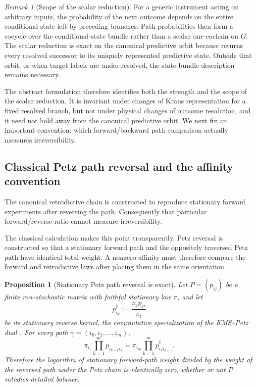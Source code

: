 \documentclass[11pt]{article}
\newtheorem{proposition}[theorem]{Proposition}
\theoremstyle{definition}
\theoremstyle{remark}
\newtheorem{remark}[theorem]{Remark}
\begin{document}
\begin{remark}[Scope of the scalar reduction]
For a generic instrument acting on arbitrary inputs, the probability of the
next outcome depends on the entire conditional state left by preceding
branches.  Path probabilities then form a cocycle over the conditional-state
bundle rather than a scalar one-cochain on $G$.  The scalar reduction is exact
on the canonical predictive orbit because
 returns every resolved successor to its
uniquely represented predictive state.  Outside that orbit, or when target
labels are under-resolved, the state-bundle description remains necessary.
\end{remark}

The abstract formulation therefore identifies both the strength and the scope of
the scalar reduction.  It is invariant under changes of Kraus representation for
a fixed resolved branch, but not under physical changes of outcome resolution,
and it need not hold away from the canonical predictive orbit.  We next fix an
important convention: which forward/backward path comparison actually measures
irreversibility.

\subsection{Classical Petz path reversal and the affinity convention}
\label{subsec:classical-petz-path-reversal}

The canonical retrodictive chain is constructed to reproduce stationary
forward experiments after reversing the path.  Consequently that particular
forward/reverse ratio cannot measure irreversibility.

The classical calculation makes this point transparently.  Petz reversal is
constructed so that a stationary forward path and the oppositely traversed Petz
path have identical total weight.  A nonzero affinity must therefore compare the
forward and retrodictive laws after placing them in the same orientation.

\begin{proposition}[Stationary Petz path reversal is exact]
\label{prop:stationary-petz-path-reversal}
Let \(P=(p_{ij})\) be a finite row-stochastic matrix with faithful stationary
law \(\pi\), and let
\[
 p^\sharp_{ij}:=\frac{\pi_jp_{ji}}{\pi_i}
\]
be its stationary reverse kernel, the commutative specialization of the
KMS--Petz dual \cite{Petz1986,Petz2003}.  For every path
\(\gamma=(i_0,i_1,\ldots,i_m)\),
\[
 \boxed{
 \pi_{i_0}\prod_{k=1}^m p_{i_{k-1}i_k}
 =
 \pi_{i_m}\prod_{k=1}^m p^\sharp_{i_ki_{k-1}}.}
\]
Therefore the logarithm of stationary forward-path weight divided by the
weight of the reversed path under the Petz chain is identically zero,
whether or not \(P\) satisfies detailed balance.
\end{proposition}
\end{document}
